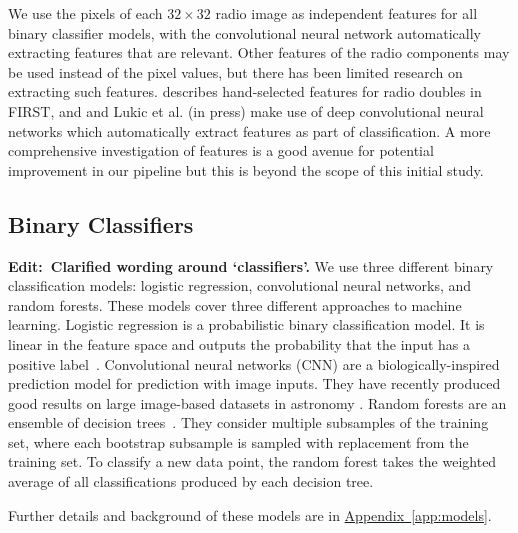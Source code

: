\documentclass[fleqn,usenatbib,usedcolumn]{mnras}
\newcommand{\edit}[1]{{\bf Edit:~{#1}}}
\newcommand{\aref}[1]{\hyperref[#1]{Appendix~\ref{#1}}}
\begin{document}
    We use the pixels of each $32 \times 32$ radio image as independent features for all binary classifier models, with the convolutional neural network automatically extracting features that are relevant. Other features of the radio components may be used instead of the pixel values, but there has been limited research on extracting such features. \citet{proctor06} describes hand-selected features for radio doubles in FIRST, and \citet{aniyan17cnn} and Lukic et al. (in press) make use of deep convolutional neural networks which automatically extract features as part of classification. A more comprehensive investigation of features is a good avenue for potential improvement in our pipeline but this is beyond the scope of this initial study.

  \subsection{Binary Classifiers}\label{sec:classifiers}

    \edit{Clarified wording around `classifiers'.} We use three different binary classification models: logistic regression, convolutional neural networks, and random forests. These models cover three different approaches to machine learning. Logistic regression is a probabilistic binary classification model. It is linear in the feature space and outputs the probability that the input has a positive label~\citep[Chap. 4]{bishop06ml}. Convolutional neural networks (CNN) are a biologically-inspired prediction model for prediction with image inputs. They have recently produced good results on large image-based datasets in astronomy \citep[e.g.][Lukic et al. in press]{dieleman15cnn}. Random forests are an ensemble of decision trees~\citep{breiman01random-forest}. They consider multiple subsamples of the training set, where each bootstrap subsample is sampled with replacement from the training set. To classify a new data point, the random forest takes the weighted average of all classifications produced by each decision tree.

    Further details and background of these models are in \aref{app:models}.
\end{document}
